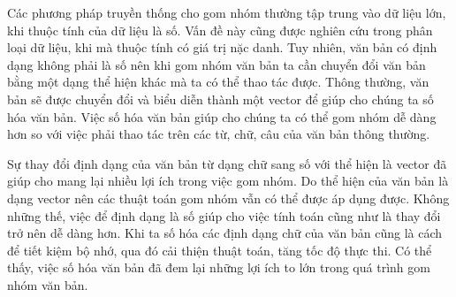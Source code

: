 Các phương pháp truyền thống cho gom nhóm thường tập trung vào dữ liệu lớn, khi thuộc tính của dữ liệu là số.
Vấn đề này cũng được nghiên cứu trong phân loại dữ liệu, khi mà thuộc tính có giá trị nặc danh.
Tuy nhiên, văn bản có định dạng không phải là số nên khi gom nhóm văn bản ta cần chuyển đổi văn bản bằng một dạng thể hiện khác mà ta có thể thao tác được.
Thông thường, văn bản sẽ được chuyển đổi và biểu diễn thành một vector để giúp cho chúng ta số hóa văn bản.
Việc số hóa văn bản giúp cho chúng ta có thể gom nhóm dễ dàng hơn so với việc phải thao tác trên các từ, chữ, câu của văn bản thông thường.

Sự thay đổi định dạng của văn bản từ dạng chữ sang số với thể hiện là vector đã giúp cho mang lại nhiều lợi ích trong việc gom nhóm.
Do thể hiện của văn bản là dạng vector nên các thuật toán gom nhóm vẫn có thể được áp dụng được.
Không những thế, việc để định dạng là số giúp cho việc tính toán cũng như là thay đổi trở nên dễ dàng hơn.
Khi ta số hóa các định dạng chữ của văn bản cũng là cách để tiết kiệm bộ nhớ, qua đó cải thiện thuật toán, tăng tốc độ thực thi.
Có thể thấy, việc số hóa văn bản đã đem lại những lợi ích to lớn trong quá trình gom nhóm văn bản.



